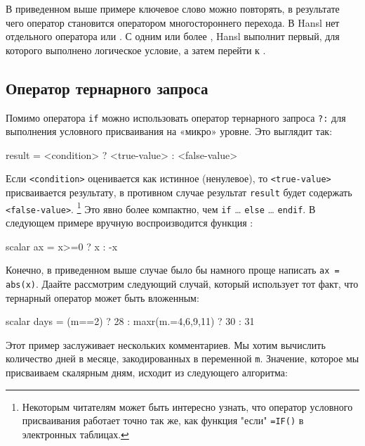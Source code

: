 В приведенном выше примере ключевое слово  можно повторять,
в результате чего оператор  становится оператором
многостороннего перехода. В Hansl нет отдельного оператора
 или . С одним или более , Hansl
выполнит первый, для которого выполнено логическое условие, а затем
перейти к .



\subsection{Оператор тернарного запроса}

Помимо оператора \texttt{if} можно использовать оператор тернарного
запроса \texttt{?:} для выполнения условного присваивания на «микро»
уровне. Это выглядит так:
\begin{code}
result = <condition> ? <true-value> : <false-value>
\end{code}
Если \texttt{<condition>} оценивается как истинное (ненулевое), то
\texttt{<true-value>} присваивается результату, в противном случае
результат \texttt{result} будет содержать
\texttt{<false-value>}. \footnote{Некоторым читателям может быть
  интересно узнать, что оператор условного присваивания работает точно
  так же, как функция "если" \texttt{=IF()} в электронных таблицах.}
Это явно более компактно, чем \texttt{if} \dots{} \texttt{else}
\dots{} \texttt{endif}. В следующем примере вручную воспроизводится
функция :

\begin{code}
scalar ax = x>=0 ? x : -x
\end{code}
Конечно, в приведенном выше случае было бы намного проще написать
\texttt{ax = abs(x)}. Даайте рассмотрим следующий случай, который
использует тот факт, что тернарный оператор может быть вложенным:
\begin{code}
scalar days = (m==2) ? 28 : maxr(m.={4,6,9,11}) ? 30 : 31
\end{code}
Этот пример заслуживает нескольких комментариев. Мы хотим вычислить
количество дней в месяце, закодированных в переменной
\texttt{m}. Значение, которое мы присваиваем скалярным дням, исходит
из следующего алгоритма:

